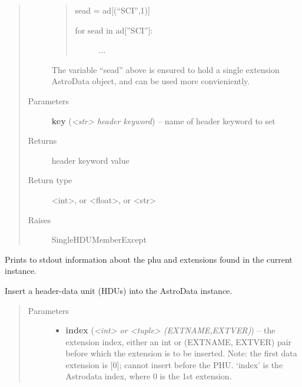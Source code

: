 \documentclass[letterpaper,10pt,english]{sphinxmanual}
\begin{document}
\begin{fulllineitems}
\begin{fulllineitems}
\begin{quote}
\begin{description}
\begin{quote}
sead = ad{[}(``SCI'',1){]}
\begin{description}
\item[{for sead in ad{[}''SCI''{]}:}] \leavevmode
...

\end{description}
\end{quote}

The variable ``sead'' above is ensured to hold a single extension
AstroData object, and can be used more convieniently.

\item[{Parameters}] \leavevmode
\textbf{key} (\emph{\textless{}str\textgreater{} header keyword}) -- name of header keyword to set

\item[{Returns}] \leavevmode
header keyword value

\item[{Return type}] \leavevmode
\textless{}int\textgreater{}, or \textless{}float\textgreater{}, or \textless{}str\textgreater{}

\item[{Raises}] \leavevmode
SingleHDUMemberExcept

\end{description}\end{quote}

\end{fulllineitems}


\begin{fulllineitems}
\label{astro_class:astrodata.AstroData.AstroData.info}
Prints to stdout information about the phu and extensions found 
in the current instance.

\end{fulllineitems}


\begin{fulllineitems}
\label{astro_class:astrodata.AstroData.AstroData.insert}
Insert a header-data unit (HDUs) into the AstroData instance.
\begin{quote}\begin{description}
\item[{Parameters}] \leavevmode\begin{itemize}
\item {} 
\textbf{index} (\emph{\textless{}int\textgreater{} or \textless{}tuple\textgreater{} (EXTNAME,EXTVER)}) -- the extension index, either an int or (EXTNAME, EXTVER)
pair before which the extension is to be inserted.
Note: the first data extension is {[}0{]}; cannot insert
before the PHU. `index' is the  Astrodata index, where
0 is the 1st extension.


\end{itemize}
\end{description}
\end{quote}
\end{fulllineitems}
\end{fulllineitems}
\end{document}
